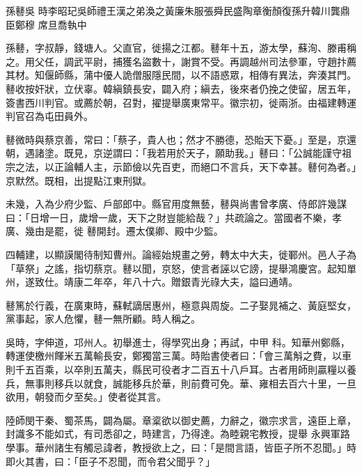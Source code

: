 
\begin{pinyinscope}

 孫鼛吳
 時李昭玘吳師禮王漢之弟渙之黃廉朱服張舜民盛陶章衡顏復孫升韓川龔鼎臣鄭穆
 席旦喬執中



 孫鼛，字叔靜，錢塘人。父直官，徙揚之江都。鼛年十五，游太學，蘇洵、滕甫稱之。用父任，調武平尉，捕獲名盜數十，謝賞不受。再調越州司法參軍，守趙抃薦其材。知偃師縣，蒲中優人詭僧服隱民間，以不語惑眾，相傳有異法，奔湊其門。鼛收按奸狀，立伏辜。韓縝鎮長安，闢入府；縝去，後來者仍挽之使留，居五年，簽書西川判官。或薦於朝，召對，擢提舉廣東常平。徽宗初，徙兩浙。由福建轉運
 判官召為屯田員外。



 鼛微時與蔡京善，常曰：「蔡子，貴人也；然才不勝德，恐貽天下憂。」至是，京還朝，遇諸塗。既見，京逆謂曰：「我若用於天子，願助我。」鼛曰：「公誠能謹守祖宗之法，以正論輔人主，示節儉以先百吏，而絕口不言兵，天下幸甚。鼛何為者。」京默然。既相，出提點江東刑獄。



 未幾，入為少府少監、戶部郎中。縣官用度無藝，鼛與尚書曾孝廣、侍郎許幾謀曰：「日增一日，歲增一歲，天下之財豈能給哉？」共疏論之。當國者不樂，孝廣、幾由是罷，徙
 鼛開封。遷太僕卿、殿中少監。



 四輔建，以顯謨閣待制知曹州。論經始規畫之勞，轉太中大夫，徙鄆州。邑人子為「草祭」之謠，指切蔡京。鼛以聞，京怒，使言者誣以它謗，提舉鴻慶宮。起知單州，遂致仕。靖康二年卒，年八十六。贈銀青光祿大夫，謚曰通靖。



 鼛篤於行義，在廣東時，蘇軾謫居惠州，極意與周旋。二子娶晁補之、黃庭堅女，黨事起，家人危懼，鼛一無所顧。時人稱之。



 吳時，字伸道，邛州人。初舉進士，得學究出身；再試，中甲
 科。知華州鄭縣，轉運使檄州餫米五萬輸長安，鄭獨當三萬。時貽書使者曰：「會三萬斛之費，以車則千五百乘，以卒則五萬夫，縣民可役者才二百五十八戶耳。古者用師則贏糧以養兵，無事則移兵以就食，誠能移兵於華，則前費可免。華、雍相去百六十里，一旦欲用，朝發而夕至矣。」使者從其言。



 陸師閔干秦、蜀茶馬，闢為屬。章楶欲以御史薦，力辭之，徽宗求言，遠臣上章，封識多不能如式，有司悉卻之，時建言，乃得達。為睦親宅教授，提舉
 永興軍路學事。華州諸生有觸忌諱者，教授欲上之，曰：「是間言語，皆臣子所不忍聞。」時即火其書，曰：「臣子不忍聞，而令君父聞乎？」




\end{pinyinscope}
